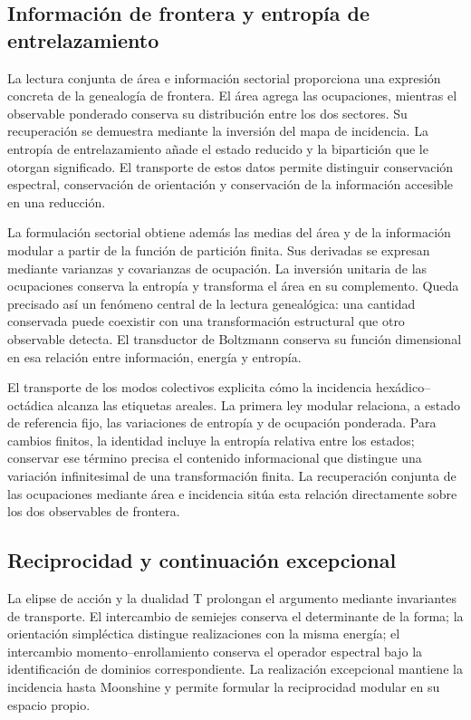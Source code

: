 \subsection{Información de frontera y entropía de entrelazamiento}

La lectura conjunta de área e información sectorial proporciona una
expresión concreta de la genealogía de frontera. El área agrega las
ocupaciones, mientras el observable ponderado conserva su distribución
entre los dos sectores. Su recuperación se demuestra mediante la
inversión del mapa de incidencia. La entropía de entrelazamiento añade
el estado reducido y la bipartición que le otorgan significado. El
transporte de estos datos permite distinguir conservación espectral,
conservación de orientación y conservación de la información accesible
en una reducción.

La formulación sectorial obtiene además las medias del área y de la
información modular a partir de la función de partición finita. Sus
derivadas se expresan mediante varianzas y covarianzas de ocupación.
La inversión unitaria de las ocupaciones conserva la entropía y
transforma el área en su complemento. Queda precisado así un fenómeno
central de la lectura genealógica: una cantidad conservada puede
coexistir con una transformación estructural que otro observable
detecta. El transductor de Boltzmann conserva su función dimensional
en esa relación entre información, energía y entropía.

El transporte de los modos colectivos explicita cómo la incidencia
hexádico--octádica alcanza las etiquetas areales. La primera ley
modular relaciona, a estado de referencia fijo, las variaciones de
entropía y de ocupación ponderada. Para cambios finitos, la identidad
incluye la entropía relativa entre los estados; conservar ese término
precisa el contenido informacional que distingue una variación
infinitesimal de una transformación finita. La recuperación conjunta
de las ocupaciones mediante área e incidencia sitúa esta relación
directamente sobre los dos observables de frontera.

\subsection{Reciprocidad y continuación excepcional}

La elipse de acción y la dualidad T prolongan el argumento mediante
invariantes de transporte. El intercambio de semiejes conserva el
determinante de la forma; la orientación simpléctica distingue
realizaciones con la misma energía; el intercambio momento--enrollamiento
conserva el operador espectral bajo la identificación de dominios
correspondiente. La realización excepcional mantiene la incidencia
hasta Moonshine y permite formular la reciprocidad modular en su
espacio propio.

